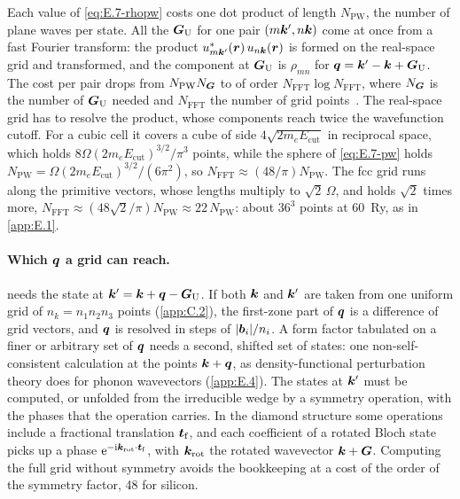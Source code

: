 Each value of \cref{eq:E.7-rhopw} costs one dot product of length $N_{\mathrm{PW}}$, the number of plane waves per state. All the $\bm{G}_{\mathrm{U}}$ for one pair $(m\bm{k}', n\bm{k})$ come at once from a fast Fourier transform: the product $u^*_{m\bm{k}'}(\bm{r})\,u_{n\bm{k}}(\bm{r})$ is formed on the real-space grid and transformed, and the component at $\bm{G}_{\mathrm{U}}$ is $\rho_{mn}$ for $\bm{q} = \bm{k}' - \bm{k} + \bm{G}_{\mathrm{U}}$. The cost per pair drops from $N_{\mathrm{PW}}N_{\bm{G}}$ to of order $N_{\mathrm{FFT}}\log N_{\mathrm{FFT}}$, where $N_{\bm{G}}$ is the number of $\bm{G}_{\mathrm{U}}$ needed and $N_{\mathrm{FFT}}$ the number of grid points~\cite[below Eq.~(3.15)]{griffin2021extended}. The real-space grid has to resolve the product, whose components reach twice the wavefunction cutoff. For a cubic cell it covers a cube of side $4\sqrt{2m_eE_{\mathrm{cut}}}$ in reciprocal space, which holds $8\Omega(2m_eE_{\mathrm{cut}})^{3/2}/\pi^3$ points, while the sphere of \cref{eq:E.7-pw} holds $N_{\mathrm{PW}} = \Omega(2m_eE_{\mathrm{cut}})^{3/2}/(6\pi^2)$, so $N_{\mathrm{FFT}} \approx (48/\pi)N_{\mathrm{PW}}$. The fcc grid runs along the primitive vectors, whose lengths multiply to $\sqrt2\,\Omega$, and holds $\sqrt2$ times more, $N_{\mathrm{FFT}} \approx (48\sqrt2/\pi)N_{\mathrm{PW}} \approx 22\,N_{\mathrm{PW}}$: about $36^3$ points at \SI{60}{Ry}, as in \cref{app:E.1}.

\paragraph{Which $\bm{q}$ a grid can reach.}  needs the state at $\bm{k}' = \bm{k}+\bm{q} - \bm{G}_{\mathrm{U}}$. If both $\bm{k}$ and $\bm{k}'$ are taken from one uniform grid of $n_k = n_1n_2n_3$ points (\cref{app:C.2}), the first-zone part of $\bm{q}$ is a difference of grid vectors, and $\bm{q}$ is resolved in steps of $|\bm{b}_i|/n_i$. A form factor tabulated on a finer or arbitrary set of $\bm{q}$ needs a second, shifted set of states: one non-self-consistent calculation at the points $\bm{k}+\bm{q}$, as density-functional perturbation theory does for phonon wavevectors (\cref{app:E.4}). The states at $\bm{k}'$ must be computed, or unfolded from the irreducible wedge by a symmetry operation, with the phases that the operation carries. In the diamond structure some operations include a fractional translation $\bm{t}_{\mathrm{f}}$, and each coefficient of a rotated Bloch state picks up a phase $\mathrm{e}^{-\mathrm{i}\bm{k}_{\mathrm{rot}}\cdot\bm{t}_{\mathrm{f}}}$, with $\bm{k}_{\mathrm{rot}}$ the rotated wavevector $\bm{k}+\bm{G}$. Computing the full grid without symmetry avoids the bookkeeping at a cost of the order of the symmetry factor, 48 for silicon.

